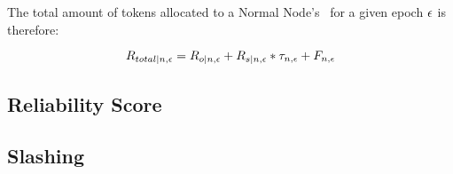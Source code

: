The total amount of tokens allocated to a Normal Node's \operationPool\ for a given epoch $\epsilon$ is therefore:

\begin{equation}
    R_{total|n, \epsilon} = 
    R_{o|n, \epsilon}
    + R_{s|n, \epsilon} * \tau_{n, \epsilon}
    + F_{n, \epsilon}
\end{equation}

\subsection{Reliability Score}

\subsection{Slashing}